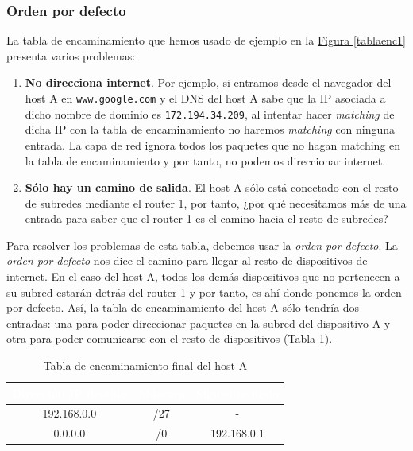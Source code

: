 \documentclass[10pt,a4paper,spanish]{report}
\begin{document}
\subsubsection{\textcolor{tema4}Orden por defecto}
La tabla de encaminamiento que hemos usado de ejemplo en la \hyperref[tablaenc1]{Figura \ref*{tablaenc1}} presenta varios problemas:
\begin{enumerate}[\color{tema4}{$\bigstar$}]
  \item \textbf{\textcolor{tema4}{No direcciona internet}}. Por ejemplo, si entramos desde el navegador del host A en \texttt{www.google.com} y el DNS del host A sabe que la IP asociada a dicho nombre de dominio es \texttt{172.194.34.209}, al intentar hacer \textit{\textcolor{tema4}{matching}} de dicha IP con la tabla de encaminamiento no haremos \textit{\textcolor{tema4}{matching}} con ninguna entrada. La capa de red ignora todos los paquetes que no hagan matching en la tabla de encaminamiento y por tanto, no podemos direccionar internet.

  \item \textbf{\textcolor{tema4}{Sólo hay un camino de salida}}. El host A sólo está conectado con el resto de subredes mediante el router 1, por tanto, ¿por qué necesitamos más de una entrada para saber que el router 1 es el camino hacia el resto de subredes?
\end{enumerate}

Para resolver los problemas de esta tabla, debemos usar la \textit{\textcolor{tema4}{orden por defecto}}. La \textit{\textcolor{tema4}{orden por defecto}} nos dice el camino para llegar al resto de dispositivos de internet. En el caso del host A, todos los demás dispositivos que no pertenecen a su subred estarán detrás del router 1 y por tanto, es ahí donde ponemos la orden por defecto. Así, la tabla de encaminamiento del host A sólo tendría dos entradas: una para poder direccionar paquetes en la subred del dispositivo A y otra para poder comunicarse con el resto de dispositivos (\hyperref[fintabA]{Tabla \ref*{fintabA}}).

\begin{table}[H]
\centering
\begin{tabular}{| c | c | c |}
\hline
\rowcolor[rgb]{0.0,0.58,0.71} \textcolor{white}{Dirección IP destino} & \textcolor{white}{Máscara} & \textcolor{white}{Siguiente nodo} \\
\hline 
 192.168.0.0 & /27 & - \\
\hline
 0.0.0.0 & /0 & 192.168.0.1 \\
\hline
\end{tabular}
\caption{Tabla de encaminamiento final del host A}
\label{fintabA}
\end{table}
\end{document}
